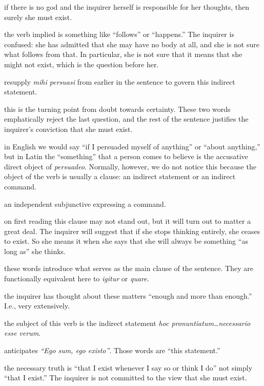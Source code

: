  if there is no god and the inquirer herself is responsible for her thoughts, then surely she must exist.

 the verb implied is something like ``follows'' or ``happens.'' The inquirer is confused: she has admitted that she may have no body at all, and she is not sure what follows from that. In particular, she is not sure that it means that she might not exist, which is the question before her.

 resupply \textit{mihi persuasi} from earlier in the sentence to govern this indirect statement.

 this is the turning point from doubt towards certainty. These two words emphatically reject the last question, and the rest of the sentence justifies the inquirer's conviction that she must exist.

 in English we would say ``if I persuaded myself of anything'' or ``about anything,'' but in Latin the ``something'' that a person comes to believe is the accusative direct object of \textit{persuadeo}. Normally, however, we do not notice this because the object of the verb is usually a clause: an indirect statement or an indirect command.

 an independent subjunctive expressing a command.

 on first reading this clause may not stand out, but it will turn out to matter a great deal. The inquirer will suggest that if she stops thinking entirely, she ceases to exist. So she means it when she says that she will always be something ``as long as'' she thinks.

 these words introduce what serves as the main clause of the sentence. They are functionally equivalent here to \textit{igitur} or \textit{quare}.

 the inquirer has thought about these matters ``enough and more than enough.'' I.e., very extensively.

 the subject of this verb is the indirect statement \textit{hoc pronuntiatum\dots necessario esse verum}.

 anticipates \textit{``Ego sum, ego existo''}. Those words are ``this statement.''

 the necessary truth is ``that I exist whenever I say so or think I do'' not simply ``that I exist.'' The inquirer is not committed to the view that she must exist.

